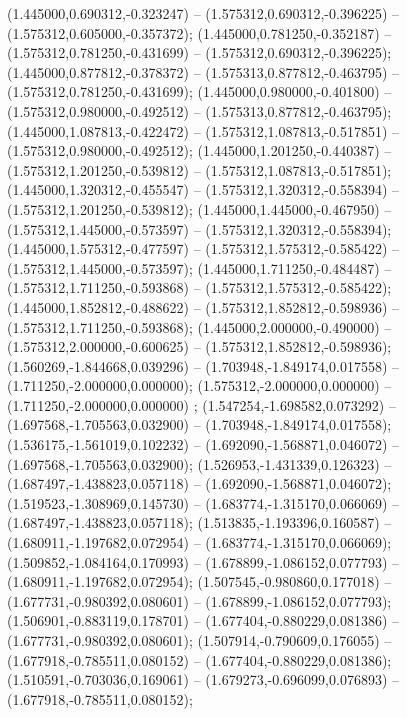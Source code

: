  (1.445000,0.690312,-0.323247) -- (1.575312,0.690312,-0.396225) -- (1.575312,0.605000,-0.357372);
 (1.445000,0.781250,-0.352187) -- (1.575312,0.781250,-0.431699) -- (1.575312,0.690312,-0.396225);
 (1.445000,0.877812,-0.378372) -- (1.575313,0.877812,-0.463795) -- (1.575312,0.781250,-0.431699);
 (1.445000,0.980000,-0.401800) -- (1.575312,0.980000,-0.492512) -- (1.575313,0.877812,-0.463795);
 (1.445000,1.087813,-0.422472) -- (1.575312,1.087813,-0.517851) -- (1.575312,0.980000,-0.492512);
 (1.445000,1.201250,-0.440387) -- (1.575312,1.201250,-0.539812) -- (1.575312,1.087813,-0.517851);
 (1.445000,1.320312,-0.455547) -- (1.575312,1.320312,-0.558394) -- (1.575312,1.201250,-0.539812);
 (1.445000,1.445000,-0.467950) -- (1.575312,1.445000,-0.573597) -- (1.575312,1.320312,-0.558394);
 (1.445000,1.575312,-0.477597) -- (1.575312,1.575312,-0.585422) -- (1.575312,1.445000,-0.573597);
 (1.445000,1.711250,-0.484487) -- (1.575312,1.711250,-0.593868) -- (1.575312,1.575312,-0.585422);
 (1.445000,1.852812,-0.488622) -- (1.575312,1.852812,-0.598936) -- (1.575312,1.711250,-0.593868);
 (1.445000,2.000000,-0.490000) -- (1.575312,2.000000,-0.600625) -- (1.575312,1.852812,-0.598936);
 (1.560269,-1.844668,0.039296) -- (1.703948,-1.849174,0.017558) -- (1.711250,-2.000000,0.000000);
 (1.575312,-2.000000,0.000000) -- (1.711250,-2.000000,0.000000) ;
 (1.547254,-1.698582,0.073292) -- (1.697568,-1.705563,0.032900) -- (1.703948,-1.849174,0.017558);
 (1.536175,-1.561019,0.102232) -- (1.692090,-1.568871,0.046072) -- (1.697568,-1.705563,0.032900);
 (1.526953,-1.431339,0.126323) -- (1.687497,-1.438823,0.057118) -- (1.692090,-1.568871,0.046072);
 (1.519523,-1.308969,0.145730) -- (1.683774,-1.315170,0.066069) -- (1.687497,-1.438823,0.057118);
 (1.513835,-1.193396,0.160587) -- (1.680911,-1.197682,0.072954) -- (1.683774,-1.315170,0.066069);
 (1.509852,-1.084164,0.170993) -- (1.678899,-1.086152,0.077793) -- (1.680911,-1.197682,0.072954);
 (1.507545,-0.980860,0.177018) -- (1.677731,-0.980392,0.080601) -- (1.678899,-1.086152,0.077793);
 (1.506901,-0.883119,0.178701) -- (1.677404,-0.880229,0.081386) -- (1.677731,-0.980392,0.080601);
 (1.507914,-0.790609,0.176055) -- (1.677918,-0.785511,0.080152) -- (1.677404,-0.880229,0.081386);
 (1.510591,-0.703036,0.169061) -- (1.679273,-0.696099,0.076893) -- (1.677918,-0.785511,0.080152);
